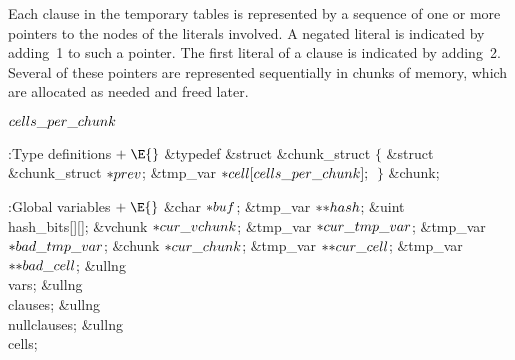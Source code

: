 Each clause in the temporary tables is represented by a
sequence of
one or more pointers to the  nodes of the literals involved.
A negated literal is indicated by adding~1 to such a pointer.
The first literal of a clause is indicated by adding~2.
Several of these pointers are represented sequentially in chunks
of memory, which are allocated as needed and freed later.

\Y\B\4\D$\\{cells\_per\_chunk}$ \5
\par
\Y\B\4:Type definitions\X${}\mathrel+\E{}$\6
\&{typedef} \&{struct} \&{chunk\_struct} ${}\{{}$\1\6
\&{struct} \&{chunk\_struct} ${}{*}\\{prev}{}$;\6
\&{tmp\_var} ${}{*}\\{cell}[\\{cells\_per\_chunk}];{}$\2\6
${}\}{}$ \&{chunk};\par
\fi

\B{}:Global variables\X${}\mathrel+\E{}$\6
\&{char} ${}{*}\\{buf}{}$;\6
\&{tmp\_var} ${}{*}{*}\\{hash}{}$;\6
\&{uint} \\{hash\_bits}[][];\6
\&{vchunk} ${}{*}\\{cur\_vchunk}{}$;\6
\&{tmp\_var} ${}{*}\\{cur\_tmp\_var}{}$;\6
\&{tmp\_var} ${}{*}\\{bad\_tmp\_var}{}$;\6
\&{chunk} ${}{*}\\{cur\_chunk}{}$;\6
\&{tmp\_var} ${}{*}{*}\\{cur\_cell}{}$;\6
\&{tmp\_var} ${}{*}{*}\\{bad\_cell}{}$;\6
\&{ullng} \\{vars};\6
\&{ullng} \\{clauses};\6
\&{ullng} \\{nullclauses};\6
\&{ullng} \\{cells};\par
\fi

